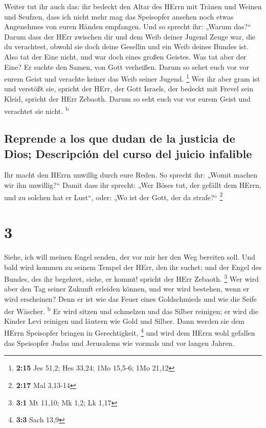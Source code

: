  Weiter tut ihr auch das: ihr bedeckt den Altar des HErrn
mit Tränen und Weinen und Seufzen, dass ich nicht mehr mag das
Speisopfer ansehen noch etwas Angenehmes von euren Händen empfangen.
 Und so sprecht ihr: „Warum das?{}`` Darum dass der HErr
zwischen dir und dem Weib deiner Jugend Zeuge war, die du verachtest,
obwohl sie doch deine Gesellin und ein Weib deines Bundes ist.
 Also tat der Eine nicht, und war doch eines großen
Geistes. Was tat aber der Eine? Er suchte den Samen, von Gott verheißen.
Darum so sehet euch vor vor eurem Geist und verachte keiner das Weib
seiner Jugend. \footnote{\textbf{2:15} Jes 51,2; Hes 33,24; 1Mo 15,5-6;
  1Mo 21,12}  Wer ihr aber gram ist und verstößt sie,
spricht der HErr, der Gott Israels, der bedeckt mit Frevel sein Kleid,
spricht der HErr Zebaoth. Darum so seht euch vor vor eurem Geist und
verachtet sie nicht. \textsuperscript{b}

\hypertarget{reprende-a-los-que-dudan-de-la-justicia-de-dios-descripciuxf3n-del-curso-del-juicio-infalible}{%
\subsection{Reprende a los que dudan de la justicia de Dios; Descripción
del curso del juicio
infalible}\label{reprende-a-los-que-dudan-de-la-justicia-de-dios-descripciuxf3n-del-curso-del-juicio-infalible}}

 Ihr macht den HErrn unwillig durch eure Reden. So
sprecht ihr: „Womit machen wir ihn unwillig?{}`` Damit dass ihr sprecht:
„Wer Böses tut, der gefällt dem HErrn, und zu solchen hat er Lust``,
oder: „Wo ist der Gott, der da strafe?{}`` \footnote{\textbf{2:17} Mal
  3,13-14}

\hypertarget{section-2}{%
\section{3}\label{section-2}}

 Siehe, ich will meinen Engel senden, der vor mir her den
Weg bereiten soll. Und bald wird kommen zu seinem Tempel der HErr, den
ihr suchet; und der Engel des Bundes, des ihr begehret, siehe, er kommt!
spricht der HErr Zebaoth. \footnote{\textbf{3:1} Mt 11,10; Mk 1,2; Lk
  1,17}  Wer wird aber den Tag seiner Zukunft erleiden
können, und wer wird bestehen, wenn er wird erscheinen? Denn er ist wie
das Feuer eines Goldschmieds und wie die Seife der Wäscher.
\textsuperscript{b}  Er wird sitzen und schmelzen und das
Silber reinigen; er wird die Kinder Levi reinigen und läutern wie Gold
und Silber. Dann werden sie dem HErrn Speisopfer bringen in
Gerechtigkeit, \footnote{\textbf{3:3} Sach 13,9}  und wird
dem HErrn wohl gefallen das Speisopfer Judas und Jerusalems wie vormals
und vor langen Jahren.

